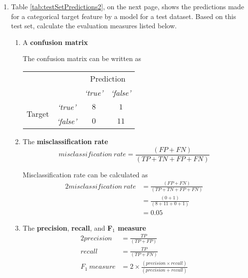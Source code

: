 \documentclass[--SOLUTION-OPTION--]{ditpaper}
\newcommand{\featL}[1]{\textit{`#1'}}
\begin{document}
\begin{enumerate}
\item Table \ref{tab:testSetPredictions2}, on the next page, shows the predictions made for a categorical target feature by a model for a test dataset. Based on this test set, calculate the evaluation measures listed below.
\begin{enumerate} 
\item A \textbf{confusion matrix}
\begin{answer}
The confusion matrix can be written as
\vspace{1em}
\noindent\begin{scriptsize}
\begin{tabular}{c c c  c }
    & &  \multicolumn{2}{c}{Prediction} \\
  & &  \featL{true} &  \featL{false} \\
  \hline
  \multirow{2}{*}{\parbox{1.1cm}{\raggedleft Target}}  & \featL{true} & $8$	&	$1$ \\
  & \featL{false} & $0$	&	$11$ 
\end{tabular}
\end{scriptsize}
\vspace{1em}
\end{answer}
\item The \textbf{misclassification rate}
\begin{equation*}
misclassification~rate = \frac{\left(FP + FN\right)}{\left(TP + TN + FP + FN\right)} 
\end{equation*}
\begin{answer}
Misclassification rate can be calculated as
\begin{alignat*}{2}
misclassification~rate & = \frac{\left(FP + FN\right)}{\left(TP + TN + FP + FN\right)} \\
 & = \frac{\left(0 + 1\right)}{\left(8 + 11 + 0 + 1\right)} \\ 
 & = 0.05
\end{alignat*}
\end{answer}
\item The \textbf{precision}, \textbf{recall}, and \textbf{F$_1$ measure}
\begin{alignat*}{2}
precision & = \frac{TP}{\left(TP + FP\right)} \\
recall & = \frac{TP}{\left(TP + FN\right)} \\
F_1~measure & = 2 \times \frac{\left(precision \times recall \right)}{\left(precision + recall\right)} \\
\end{alignat*}
\begin{answer}

\end{answer}
\end{enumerate}
\end{enumerate}
\end{document}
